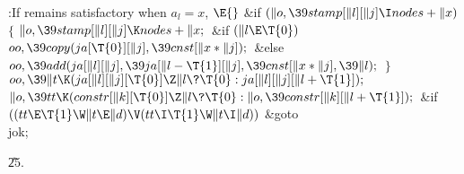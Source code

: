 \Y\B\4:If  remains satisfactory when $a_l=x$, %
\X${}\E{}$\6
\&{if} ${}(\|o,\39\\{stamp}[\|l][\|j]\I\\{nodes}+\|x){}$\5
${}\{{}$\1\6
${}\|o,\39\\{stamp}[\|l][\|j]\K\\{nodes}+\|x;{}$\6
\&{if} ${}(\|l\E\T{0}){}$\1\5
${}\\{oo},\39\\{copy}(\\{ja}[\T{0}][\|j],\39\\{cnst}[\|x*\|j]);{}$\2\6
\&{else}\1\5
${}\\{oo},\39\\{add}(\\{ja}[\|l][\|j],\39\\{ja}[\|l-\T{1}][\|j],\39\\{cnst}[%
\|x*\|j],\39\|l);{}$\2\6
\4${}\}{}$\2\6
${}\\{oo},\39\|t\K(\\{ja}[\|l][\|j][\T{0}]\Z\|l\?\T{0}:\\{ja}[\|l][\|j][\|l+%
\T{1}]);{}$\6
${}\|o,\39\\{tt}\K(\\{constr}[\|k][\T{0}]\Z\|l\?\T{0}:\|o,\39\\{constr}[\|k][%
\|l+\T{1}]);{}$\6
\&{if} ${}((\\{tt}\E\T{1}\W\|t\E\|d)\V(\\{tt}\I\T{1}\W\|t\I\|d)){}$\1\5
\&{goto} \\{jok};\2\par
\U25.\fi

